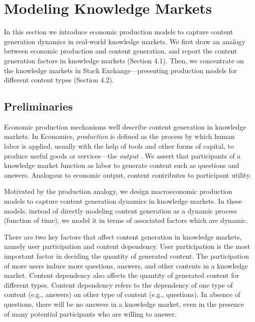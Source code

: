 \section{Modeling Knowledge Markets}
In this section we introduce economic production models to capture content generation dynamics in real-world knowledge markets. We first draw an analogy between economic production and content generation, and report the content generation factors in knowledge markets (Section 4.1). Then, we concentrate on the knowledge markets in Stack Exchange---presenting production models for different content types (Section 4.2).

\subsection{Preliminaries} 
Economic production mechanisms well describe content generation in knowledge markets. In Economics, \emph{production} is defined as the process by which human labor is applied, usually with the help of tools and other forms of capital, to produce useful goods or services---the \emph{output} \cite{stanford2008economics}. We assert that participants of a knowledge market function as labor to generate content such as questions and answers. Analogous to economic output, content contributes to participant utility. 

Motivated by the production analogy, we design macroeconomic production models to capture content generation dynamics in knowledge markets. In these models, instead of directly modeling content generation as a dynamic process (function of time), we model it in terms of associated factors which are dynamic. 

There are two key factors that affect content generation in knowledge markets, namely user participation and content dependency. User participation is the most important factor in deciding the quantity of generated content. The participation of more users induce more questions, answers, and other contents in a knowledge market. Content dependency also affects the quantity of generated content for different types. Content dependency refers to the dependency of one type of content (e.g., answers) on other type of content (e.g., questions). In absence of questions, there will be no answers in a knowledge market, even in the presence of many potential participants who are willing to answer. 



